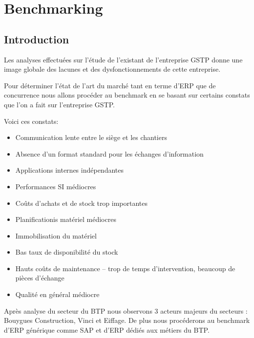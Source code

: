 \vfil
\pagebreak
\section{Benchmarking}

\subsection{Introduction}

Les analyses effectuées sur l'étude de l'existant
de l'entreprise GSTP donne une
image globale des lacunes et des dysfonctionnements
de cette entreprise.

Pour déterminer l'état de l'art du marché tant en
terme d'ERP que de concurrence
nous allons procéder au benchmark en se basant sur
certains constats que l'on
a fait sur l'entreprise GSTP.

Voici ces constats:
\begin{itemize}
\item Communication lente entre le siège et les chantiers
\item Absence d'un format standard pour les échanges d'information
\item Applications internes indépendantes
\item Performances SI médiocres
\item Coûts d'achats et de stock trop importantes
\item Planificationis matériel médiocres
\item Immobilisation du matériel
\item Bas taux de disponibilité du stock
\item Hauts coûts de maintenance – trop de temps d'intervention,
beaucoup de pièces d'échange
\item Qualité en général médiocre
\end{itemize}

Après analyse du secteur du BTP nous observons 3 acteurs majeurs du secteurs :
Bouygues Construction, Vinci et Eiffage. De plus nous procéderons au benchmark
d'ERP générique comme SAP et d'ERP dédiés aux métiers du BTP.
\vfil
\pagebreak
